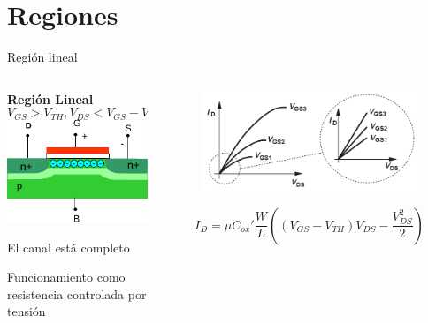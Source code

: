 \documentclass[t,aspectratio=169,10pt]{beamer}
\begin{document}
\section{Regiones}
\begin{frame}{Región lineal}

\begin{columns}

	\begin{column}{0.5\textwidth}
 
		\centering
		\textbf{Región Lineal}
		\[ V_{GS} > V_{TH}, V_{DS} < V_{GS} - V_{TH} \]
		\includegraphics[width=5cm]{lineal}
        
        El canal está completo

        \vspace{3mm}
        Funcionamiento como resistencia controlada por tensión
  
	\end{column}
 
	\begin{column}{0.5\textwidth}
 
        \begin{figure}
            \centering
            \includegraphics[width=\textwidth]{figuras/region_lineal.png}
        \end{figure}

        \[ I_D = \mu C_{ox}' \dfrac{W}{L} \left( (V_{GS} - V_{TH}) V_{DS} - \dfrac{V_{DS}^2}{2} \right) \]
  
	\end{column}
 
\end{columns}

\end{frame}
\end{document}
